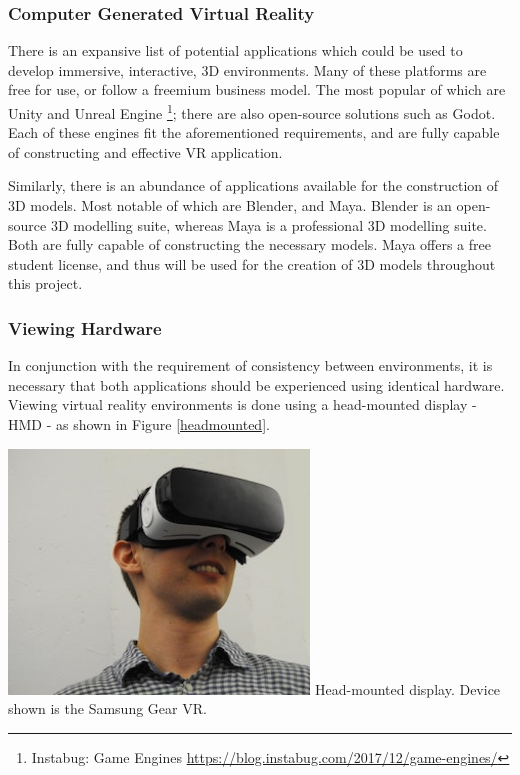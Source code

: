 \documentclass[ %
                    author={Elis Jones},
                supervisor={Dr. Kirsten Cater},
                    degree={BSc},
                     title={The Effect of Presentation Medium on Spatial Cognition},
                  subtitle={in the Virtual Environment},
                      year={2018} ]{dissertation}
\begin{document}
\subsubsection{Computer Generated Virtual Reality}
There is an expansive list of potential applications which could be used to develop immersive, interactive, 3D environments. Many of these platforms are free for use, or follow a freemium business model. The most popular of which are Unity and Unreal Engine \footnote{Instabug: Game Engines \url{https://blog.instabug.com/2017/12/game-engines/}}; there are also open-source solutions such as Godot. Each of these engines fit the aforementioned requirements, and are fully capable of constructing and effective VR application. 

Similarly, there is an abundance of applications available for the construction of 3D models. Most notable of which are Blender, and Maya. Blender is an open-source 3D modelling suite, whereas Maya is a professional 3D modelling suite. Both are fully capable of constructing the necessary models. Maya offers a free student license, and thus will be used for the creation of 3D models throughout this project.

\subsubsection{Viewing Hardware}
In conjunction with the requirement of consistency between environments, it is necessary that both applications should be experienced using identical hardware. Viewing virtual reality environments is done using a head-mounted display - HMD - as shown in Figure \ref{headmounted}.

\begin{minipage}{\textwidth}
\centering
\includegraphics[width=0.6\textwidth]{images/headmounted.jpg}
 {Head-mounted display. Device shown is the Samsung Gear VR.}
\label{headmounted}
\hfill \break
\end{minipage}
\end{document}
